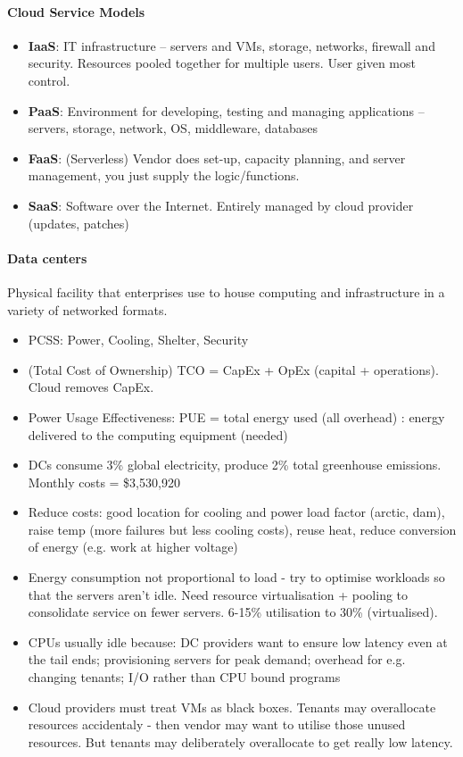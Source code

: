 \paragraph{Cloud Service Models}
\begin{itemize}
  \item \textbf{IaaS}: IT infrastructure – servers and VMs, storage, networks, firewall and security. Resources pooled together for multiple users. User given most control.
  \item \textbf{PaaS}: Environment for developing, testing and managing applications – servers, storage, network, OS, middleware, databases
  \item \textbf{FaaS}: (Serverless) Vendor does set-up, capacity planning, and server management, you just supply the logic/functions.
  \item \textbf{SaaS}: Software over the Internet. Entirely managed by cloud
    provider (updates, patches)
\end{itemize}

\paragraph{Data centers} Physical facility that enterprises use to house
computing and infrastructure in a variety of networked formats.
\begin{itemize}
\item PCSS: Power, Cooling, Shelter, Security
\item (Total Cost of Ownership) TCO = CapEx + OpEx (capital + operations). Cloud removes CapEx.
\item Power Usage Effectiveness: PUE = total energy used (all overhead) : energy delivered to the computing equipment (needed)
\item DCs consume 3\% global electricity, produce 2\% total greenhouse emissions. Monthly costs = \$3,530,920
\item Reduce costs: good location for cooling and power load factor (arctic, dam), raise temp (more failures but less cooling costs), reuse heat, 
  reduce conversion of energy (e.g. work at higher voltage)
\item Energy consumption not proportional to load - try to optimise workloads     so that the servers aren't idle. Need resource virtualisation +
  pooling to consolidate service on fewer servers. 6-15\% utilisation
  to 30\% (virtualised).
\item CPUs usually idle because: DC providers want to ensure low latency even at the tail ends; provisioning servers for peak demand; overhead for e.g. changing tenants; I/O rather than CPU bound programs
\item Cloud providers must treat VMs as black boxes. Tenants may overallocate resources accidentaly - then vendor may want to utilise those unused resources. But tenants may deliberately overallocate to get really low latency. 
\end{itemize}

